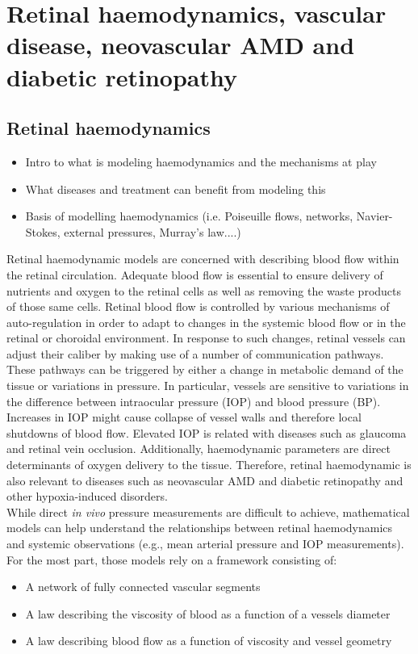 \documentclass[12pt,a4paper]{article}
\begin{document}
\section{Retinal haemodynamics, vascular disease, neovascular AMD and diabetic retinopathy}

\subsection{Retinal haemodynamics}
\begin{itemize}
\item Intro to what is modeling haemodynamics and the mechanisms at play
\item What diseases and treatment can benefit from modeling this
\item Basis of modelling haemodynamics (i.e. Poiseuille flows, networks, Navier-Stokes, external pressures, Murray's law....)
\end{itemize}
Retinal haemodynamic models are concerned with describing blood flow within the retinal circulation.
Adequate blood flow is essential to ensure delivery of nutrients and oxygen to the retinal cells as well as removing the waste products of those same cells.
Retinal blood flow is controlled by various mechanisms of auto-regulation in order to adapt to changes in the systemic blood flow or in the retinal or choroidal environment.
In response to such changes, retinal vessels can adjust their caliber by making use of a number of communication pathways.
These pathways can be triggered by either a change in metabolic demand of the tissue or variations in pressure.
In particular, vessels are sensitive to variations in the difference between intraocular pressure (IOP) and blood pressure (BP).
Increases in IOP might cause collapse of vessel walls and therefore local shutdowns of blood flow.
Elevated IOP is related with diseases such as glaucoma and retinal vein occlusion. 
Additionally, haemodynamic parameters are direct determinants of oxygen delivery to the tissue.
Therefore, retinal haemodynamic is also relevant to diseases such as neovascular AMD and diabetic retinopathy and other hypoxia-induced disorders. \\
While direct \textit{in vivo} pressure measurements are difficult to achieve, mathematical models can help understand the relationships between retinal haemodynamics and systemic observations (e.g., mean arterial pressure and IOP measurements).
For the most part, those models rely on a framework consisting of:
\begin{itemize}
\item A network of fully connected vascular segments
\item A law describing the viscosity of blood as a function of a vessels diameter
\item A law describing blood flow as a function of viscosity and vessel geometry
\end{itemize}
\end{document}
